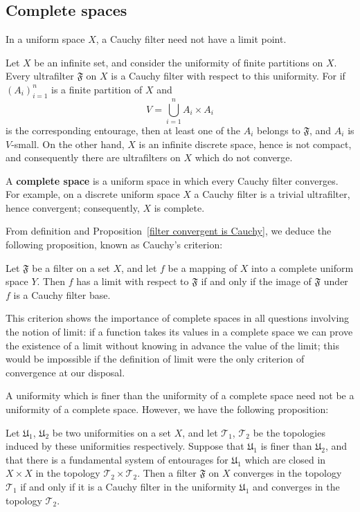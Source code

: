 \subsection{Complete spaces}
In a uniform space $X$, a Cauchy filter need not have a limit point.
\begin{example}
Let $X$ be an infinite set, and consider the uniformity of finite partitions on $X$. Every ultrafilter $\mathfrak{F}$ on $X$ is a Cauchy filter with respect to this uniformity. For if $(A_i)_{i=1}^{n}$ is a finite partition of $X$ and
\[V=\bigcup_{i=1}^{n}A_i\times A_i\]
is the corresponding entourage, then at least one of the $A_i$ belongs to $\mathfrak{F}$, and $A_i$ is $V$-small. On the other hand, $X$ is an infinite discrete space, hence is not compact, and consequently there are ultrafilters on $X$ which do not converge.
\end{example}
A \textbf{complete space} is a uniform space in which every Cauchy filter converges. For example, on a discrete uniform space $X$ a Cauchy filter is a trivial ultrafilter, hence convergent; consequently, $X$ is complete.\par
From definition and Proposition~\ref{filter convergent is Cauchy}, we deduce the following proposition, known as Cauchy's criterion:
\begin{proposition}
Let $\mathfrak{F}$ be a filter on a set $X$, and let $f$ be a mapping of $X$ into a complete uniform space $Y$. Then $f$ has a limit with respect to $\mathfrak{F}$ if and only if the image of $\mathfrak{F}$ under $f$ is a Cauchy filter base.
\end{proposition}
This criterion shows the importance of complete spaces in all questions involving the notion of limit: if a function takes its values in a complete space we can prove the existence of a limit without knowing in advance the value of the limit; this would be impossible if the definition of limit were the only criterion of convergence at our disposal.\par
A uniformity which is finer than the uniformity of a complete space need not be a uniformity of a complete space. However, we have the following proposition:
\begin{proposition}\label{uniformity finer topology converge filter iff}
Let $\mathfrak{U}_1$, $\mathfrak{U}_2$ be two uniformities on a set $X$, and let $\mathcal{T}_1$, $\mathcal{T}_2$ be the topologies induced by these uniformities respectively. Suppose that $\mathfrak{U}_1$ is finer than $\mathfrak{U}_2$, and that there is a fundamental system of entourages for $\mathfrak{U}_1$ which are closed in $X\times X$ in the topology $\mathcal{T}_2\times\mathcal{T}_2$. Then a filter $\mathfrak{F}$ on $X$ converges in the topology $\mathcal{T}_1$ if and only if it is a Cauchy filter in the uniformity $\mathfrak{U}_1$ and converges in the topology $\mathcal{T}_2$.
\end{proposition}
